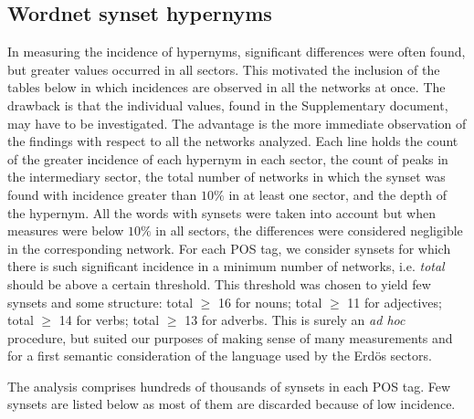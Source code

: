 \documentclass[review]{elsarticle}
\begin{document}
\subsection{Wordnet synset hypernyms}\label{subsec:wn1}
In measuring the incidence of hypernyms, significant differences were often found, but greater values
occurred in all sectors.
This motivated the inclusion of the tables below in which incidences are observed in all the networks at once.
The drawback is that the individual values, found in the Supplementary document, may have to be investigated.
The advantage is the more immediate observation of the findings with respect to all the networks analyzed.
Each line holds the count of the greater incidence of each hypernym in each sector,
the count of peaks in the intermediary sector, the total number of networks in which the
synset was found with incidence greater than $10\%$ in at least one sector,
and the depth of the hypernym.
All the words with synsets were taken into account but when measures were below $10\%$ in all
sectors, the differences were considered negligible in the corresponding network.
For each POS tag, we consider synsets for which there is such significant incidence in a minimum number of networks,
i.e. \emph{total} should be above a certain threshold.
This threshold was chosen to yield few synsets and some structure:
total $\geq$ 16 for nouns;
total $\geq$ 11 for adjectives;
total $\geq$ 14 for verbs;
total $\geq$ 13 for adverbs.
This is surely an \emph{ad hoc} procedure,
but suited our purposes of making sense of many measurements
and for a first semantic consideration of the language used by the Erd\"os sectors. 

The analysis comprises hundreds of thousands of synsets in each POS tag.
Few synsets are listed below as most of them are discarded because of low incidence. 
\end{document}
